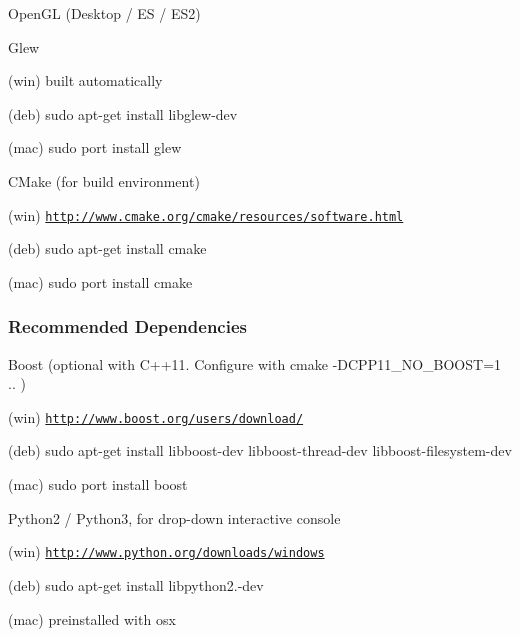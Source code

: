 \begin{DoxyItemize}
\item Open\+GL (Desktop / ES / E\+S2)
\item Glew
\begin{DoxyItemize}
\item (win) built automatically
\item (deb) sudo apt-\/get install libglew-\/dev
\item (mac) sudo port install glew
\end{DoxyItemize}
\item C\+Make (for build environment)
\begin{DoxyItemize}
\item (win) \href{http://www.cmake.org/cmake/resources/software.html}{\tt http\+://www.\+cmake.\+org/cmake/resources/software.\+html}
\item (deb) sudo apt-\/get install cmake
\item (mac) sudo port install cmake
\end{DoxyItemize}
\end{DoxyItemize}

\subsubsection*{Recommended Dependencies}


\begin{DoxyItemize}
\item Boost (optional with C++11. Configure with \textquotesingle{}cmake -\/\+D\+C\+P\+P11\+\_\+\+N\+O\+\_\+\+B\+O\+O\+ST=1 ..\textquotesingle{} )
\begin{DoxyItemize}
\item (win) \href{http://www.boost.org/users/download/}{\tt http\+://www.\+boost.\+org/users/download/}
\item (deb) sudo apt-\/get install libboost-\/dev libboost-\/thread-\/dev libboost-\/filesystem-\/dev
\item (mac) sudo port install boost
\end{DoxyItemize}
\item Python2 / Python3, for drop-\/down interactive console
\begin{DoxyItemize}
\item (win) \href{http://www.python.org/downloads/windows}{\tt http\+://www.\+python.\+org/downloads/windows}
\item (deb) sudo apt-\/get install libpython2.-\/dev
\item (mac) preinstalled with osx
\end{DoxyItemize}
\end{DoxyItemize}

